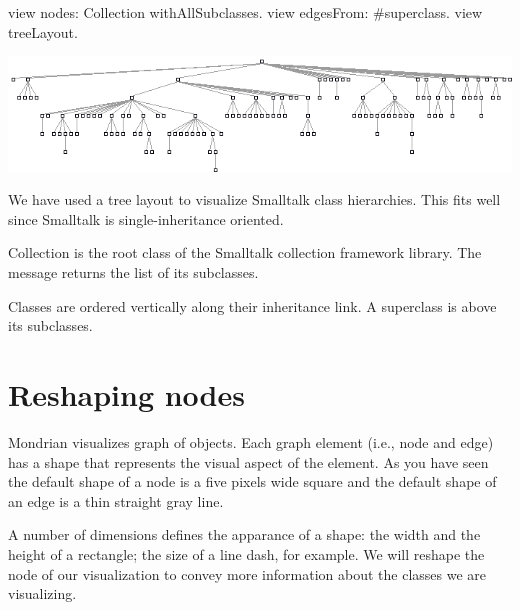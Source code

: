 \documentclass[a4paper,10pt,twoside]{book}
\begin{document}
\begin{code}{}
view nodes: Collection withAllSubclasses.
view edgesFrom: #superclass.
view treeLayout.
\end{code}
\begin{center}\includegraphics[scale=0.4]{picture4}\end{center}


We have used a tree layout to visualize Smalltalk class hierarchies. This fits well since Smalltalk is single-inheritance oriented.

Collection is the root class of the Smalltalk collection framework library. The message  returns the list of its subclasses.

Classes are ordered vertically along their inheritance link. A superclass is above its subclasses. 

\section{Reshaping nodes}

Mondrian visualizes graph of objects. Each graph element (i.e., node and edge) has a shape that represents the visual aspect of the element. As you have seen the default shape of a node is a five pixels wide square and the default shape of an edge is a thin straight gray line.

A number of dimensions defines the apparance of a shape: the width and the height of a rectangle; the size of a line dash, for example. We will reshape the node of our visualization to convey more information about the classes we are visualizing.
\end{document}
